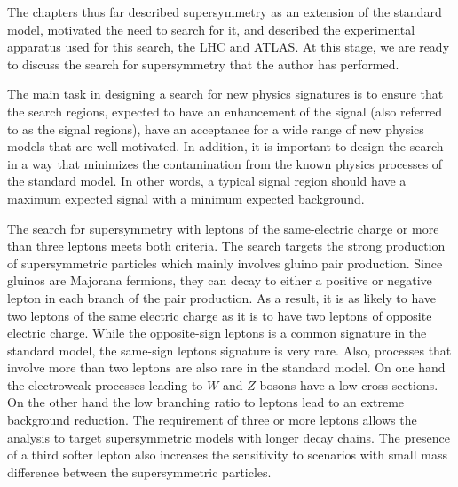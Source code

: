 The chapters thus far described supersymmetry as an extension of the standard 
model, motivated the need to search for it, and described the experimental 
apparatus used for this search, the LHC and ATLAS. 
At this stage, we are ready to discuss the search for supersymmetry that the 
author has performed.

The main task in designing a search for new physics signatures is to ensure 
that the search regions, expected to have an enhancement of the signal
 (also referred to as the signal regions), 
 have an acceptance for a wide 
range of new physics models that are well motivated.
In addition, it is important to design the search in a way that minimizes the
contamination from the known physics processes of the standard model.
In other words, a typical signal region should have a maximum expected 
signal with a minimum expected background. 

The search for supersymmetry with leptons of the same-electric charge
or more than three leptons meets both criteria. 
The search targets the strong production of supersymmetric particles 
which mainly involves gluino pair production. Since gluinos are Majorana 
fermions, they can decay to either a positive or negative lepton in each branch
of the pair production. As a result, it is as likely to have two leptons 
of the same electric charge as it is to have two leptons of opposite electric
charge. While the opposite-sign leptons is a common signature in the 
standard model, the same-sign leptons signature is very rare. 
Also, processes that involve more than two leptons are also rare in the 
standard model. On one hand the electroweak processes leading to 
$W$ and $Z$ bosons have a low cross sections. On the other hand the low 
branching ratio to leptons lead to an extreme background reduction.
The requirement of three or more leptons allows the analysis 
to target supersymmetric models with longer decay chains. The presence of 
a third softer lepton also increases the sensitivity to scenarios with 
small mass difference between the supersymmetric particles.

